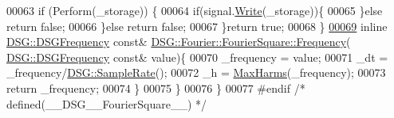 \begin{DoxyCode}
00063                 \textcolor{keywordflow}{if} (Perform(\_storage)) \{
00064                     \textcolor{keywordflow}{if}(signal.\hyperlink{class_d_s_g_1_1_ring_buffer_aa5dd2caa0a270173251faee40a43d692}{Write}(\_storage))\{
00065                     \}\textcolor{keywordflow}{else} \textcolor{keywordflow}{return} \textcolor{keyword}{false};
00066                 \}\textcolor{keywordflow}{else} \textcolor{keywordflow}{return} \textcolor{keyword}{false};
00067             \}\textcolor{keywordflow}{return} \textcolor{keyword}{true};
00068         \}
\hypertarget{_fourier_square_8h_source_l00069}{}\hyperlink{class_d_s_g_1_1_fourier_1_1_fourier_square_a120cbb563a518c9412190eaa36cb269f}{00069}         \textcolor{keyword}{inline} \hyperlink{namespace_d_s_g_a4315a061386fa1014fda09b15d3a6973}{DSG::DSGFrequency} \textcolor{keyword}{const}& 
      \hyperlink{class_d_s_g_1_1_signal_generator_a4e6b3c43e76e53f8cd337ad699c464cb}{DSG::Fourier::FourierSquare::Frequency}(
      \hyperlink{namespace_d_s_g_a4315a061386fa1014fda09b15d3a6973}{DSG::DSGFrequency} \textcolor{keyword}{const}& value)\{
00070             \_frequency = value;
00071             \_dt = \_frequency/\hyperlink{namespace_d_s_g_a72df05177db0412c3590070923f62819}{DSG::SampleRate}();
00072             \_h = \hyperlink{namespace_d_s_g_ab5c4eea42ea10b69cfc32afb83ff1d0d}{MaxHarms}(\_frequency);
00073             \textcolor{keywordflow}{return} \_frequency;
00074         \}
00075     \}
00076 \}
00077 \textcolor{preprocessor}{#endif }\textcolor{comment}{/* defined(\_\_DSG\_\_FourierSquare\_\_) */}\textcolor{preprocessor}{}
\end{DoxyCode}
